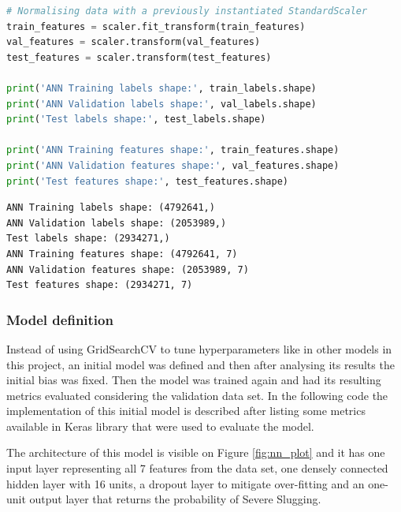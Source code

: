 \documentclass{article}
\begin{document}
\begin{lstlisting}[language=Python]
# Normalising data with a previously instantiated StandardScaler
train_features = scaler.fit_transform(train_features)
val_features = scaler.transform(val_features)
test_features = scaler.transform(test_features)

print('ANN Training labels shape:', train_labels.shape)
print('ANN Validation labels shape:', val_labels.shape)
print('Test labels shape:', test_labels.shape)

print('ANN Training features shape:', train_features.shape)
print('ANN Validation features shape:', val_features.shape)
print('Test features shape:', test_features.shape)
\end{lstlisting}
\begin{verbatim}
ANN Training labels shape: (4792641,)
ANN Validation labels shape: (2053989,)
Test labels shape: (2934271,)
ANN Training features shape: (4792641, 7)
ANN Validation features shape: (2053989, 7)
Test features shape: (2934271, 7)
\end{verbatim}

\subsubsection{Model definition}
Instead of using GridSearchCV to tune hyperparameters like in other models in this project, an initial model was defined and then after analysing its results the initial bias was fixed. Then the model was trained again and had its resulting metrics evaluated considering the validation data set. In the following code the implementation of this initial model is described after listing some metrics available in Keras library that were used to evaluate the model.  

The architecture of this model is visible on Figure \ref{fig:nn_plot} and it has one input layer representing all 7 features from the data set, one densely connected hidden layer with 16 units, a dropout layer to mitigate over-fitting and an one-unit output layer that returns the probability of Severe Slugging.
\end{document}
